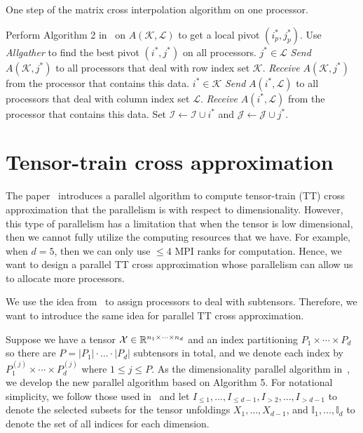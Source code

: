 \documentclass[11pt,a4paper,review]{siamart220329}
\begin{document}
\begin{algorithm}
\caption{One step of the matrix cross interpolation algorithm on one processor.}
\begin{algorithmic}[1]
\label{alg:1}
\State Perform Algorithm 2 in~\cite{dolgov2020parallel} on $A(\mathcal{K},\mathcal{L})$ to get a local pivot $(i^*_p,j^*_p)$.
\State Use \textit{Allgather} to find the best pivot $(i^*,j^*)$ on all processors.
\If $j^* \in \mathcal{L}$
\State \textit{Send} $A(\mathcal{K},j^*)$ to all processors that deal with row index set $\mathcal{K}$.
\Else
\State \textit{Receive} $A(\mathcal{K},j^*)$ from the processor that contains this data.
\EndIf
\If $i^* \in \mathcal{K}$
\State \textit{Send} $A(i^*,\mathcal{L})$ to all processors that deal with column index set $\mathcal{L}$.
\Else
\State \textit{Receive} $A(i^*,\mathcal{L})$ from the processor that contains this data.
\EndIf
\State Set $\mathcal{I} \leftarrow \mathcal{I}\cup i^*$ and $\mathcal{J} \leftarrow \mathcal{J}\cup j^*$.
\end{algorithmic}   
\end{algorithm}

\section{Tensor-train cross approximation}
The paper~\cite{dolgov2020parallel} introduces a parallel algorithm to compute tensor-train (TT) cross approximation that the parallelism is with respect to dimensionality. However, this type of parallelism has a limitation that when the tensor is low dimensional, then we cannot fully utilize the computing resources that we have. For example, when $d = 5$, then we can only use $\le 4$ MPI ranks for computation. Hence, we want to design a parallel TT cross approximation whose parallelism can allow us to allocate more processors.

We use the idea from~\cite{shi2023parallel} to assign processors to deal with subtensors. Therefore, we want to introduce the same idea for parallel TT cross approximation.

Suppose we have a tensor $\mathcal{X} \in \mathbb{R}^{n_1 \times \cdots \times n_d}$ and an index partitioning $P_1 \times \cdots \times P_d$ so there are $P = |P_1|\cdot\dots\cdot|P_d|$ subtensors in total, and we denote each index by $P_1^{(j)} \times \cdots \times P_d^{(j)}$ where $1 \le j \le P$. As the dimensionality parallel algorithm in~\cite{dolgov2020parallel}, we develop the new parallel algorithm based on Algorithm 5. For notational simplicity, we follow those used in~\cite{dolgov2020parallel} and let $I_{\le 1}, \dots, I_{\le d-1}, I_{>2}, \dots, I_{>d-1}$ to denote the selected subsets for the tensor unfoldings $X_1, \dots, X_{d-1}$, and $\mathbb{I}_1,\dots,\mathbb{I}_d$ to denote the set of all indices for each dimension.
\end{document}

